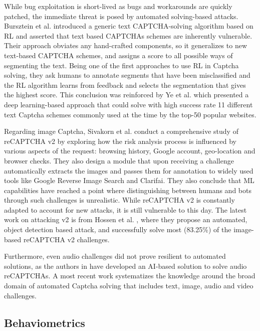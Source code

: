 While bug exploitation is short-lived as bugs and workarounds are quickly patched, the immediate threat is posed by automated solving-based attacks.
Bursztein et al. \cite{bursztein2014end} introduced a generic text CAPTCHA-solving algorithm based on \gls{RL} and asserted that text based CAPTCHAs schemes are inherently vulnerable.
Their approach obviates any hand-crafted components, so it generalizes to new text-based CAPTCHA schemes, and assigns a score to all possible ways of segmenting the text.
Being one of the first approaches to use \gls{RL} in Captcha solving, they ask humans to annotate segments that have been misclassified and the \gls{RL} algorithm learns from feedback and selects the segmentation that gives the highest score.
This conclusion was reinforced by Ye et al. \cite{ye2018yet} which presented a deep learning-based approach that could solve with high success rate 11 different text Captcha schemes commonly used at the time by the top-50 popular websites.

Regarding image Captcha, Sivakorn et al. \cite{sivakorn2016robot} conduct a comprehensive study of reCAPTCHA v2 by exploring how the risk analysis process is influenced by various aspects of the request: browsing history, Google account, geo-location and browser checks.
They also design a module that upon receiving a challenge automatically extracts the images and passes them for annotation to widely used tools like Google Reverse Image Search and Clarifai.
They also conclude that \gls{ML} capabilities have reached a point where distinguishing between humans and bots through such challenges is unrealistic.
While reCAPTCHA v2 is constantly adapted to account for new attacks, it is still vulnerable to this day.
The latest work on attacking v2 is from Hossen et al. \cite{hossen2020object}, where they propose an automated, object detection based attack, and successfully solve most (83.25\%) of the image-based reCAPTCHA v2 challenges.

Furthermore, even audio challenges did not prove resilient to automated solutions, as the authors in \cite{bock2017uncaptcha} have developed an AI-based solution to solve audio reCAPTCHAs.
A most recent work \cite{dionysiou2020sok} systematizes the knowledge around the broad domain of automated Captcha solving that includes text, image, audio and video challenges.

\subsection{Behaviometrics}


